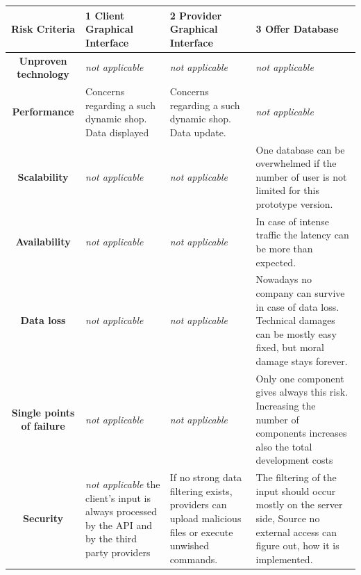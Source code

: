 \begin{table}[H]
        \begin{tabularx}{\textwidth}{|c|X|X|X|}
        \toprule
           \textbf{Risk Criteria} & \textbf{1 Client Graphical Interface} & \textbf{2 Provider Graphical Interface} & \textbf{3 Offer Database} \\
        \midrule
        \textbf{Unproven technology}& \textit{not applicable} & \textit{not applicable} & \textit{not applicable} \\
        \hline
        \textbf{Performance} & Concerns regarding a such dynamic shop. Data displayed & Concerns regarding a such dynamic shop. Data update. & \textit{not applicable} \\
        \hline
        \textbf{Scalability} & \textit{not applicable} & \textit{not applicable} & One database can be overwhelmed if the number of user is not limited for this prototype version. \\
        \hline
        \textbf{Availability} & \textit{not applicable} & \textit{not applicable} & In case of intense traffic the latency can be more than expected. \\
        \hline
        \textbf{Data loss} & \textit{not applicable} & \textit{not applicable} & Nowadays no company can survive in case of data loss. Technical damages can be 
        mostly easy fixed, but moral damage stays forever. \\
        \hline
        \textbf{Single points of failure} & \textit{not applicable} & \textit{not applicable} & Only one component gives always this risk. Increasing the 
        number of components increases also the total development costs \\
        \hline
        \textbf{Security} & \textit{not applicable} the client's input is always processed
        by the API and by the third party providers & If no strong data filtering exists, providers can upload
        malicious files or execute unwished commands. & The filtering of the input should occur mostly on the server side, Source
        no external access can figure out, how it is implemented. \\
        \bottomrule
    \end{tabularx}
\end{table}

